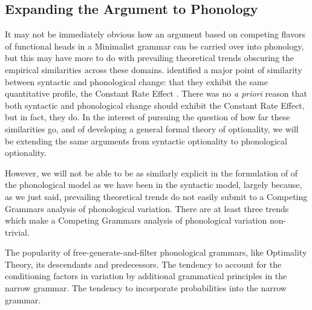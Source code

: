 
\subsection{Expanding the Argument to Phonology}

It may not be immediately obvious how an argument based on competing flavors of functional heads in a Minimalist grammar can be carried over into phonology, but this may have more to do with prevailing theoretical trends obscuring the empirical similarities across these domains.
\citet*{fruehwaldgresswallenberg2013} identified a major point of similarity between syntactic and phonological change: that they exhibit the same quantitative profile, the Constant Rate Effect \citep{kroch1989}.
There was no {\it a priori} reason that both syntactic and phonological change should exhibit the Constant Rate Effect, but in fact, they do.
In the interest of pursuing the question of how far these similarities go, and of developing a general formal theory of optionality, we will be extending the same arguments from syntactic optionality to phonological optionality.



However, we will not be able to be as similarly explicit in the formulation of of the phonological model as we have been in the syntactic model, largely because, as we just said, prevailing theoretical trends do not easily submit to a Competing Grammars analysis of phonological variation.
There are at least three trends which make a Competing Grammars analysis of phonological variation non-trivial.
\begin{exe}
	\ex \label{ot-tend}
		 The popularity of free-generate-and-filter phonological grammars, like Optimality Theory, its descendants and predecessors.
	\ex \label{gram-tend}
		The tendency to account for the conditioning factors in variation by additional grammatical principles in the narrow grammar.
	\ex \label{prob-tend}
		The tendency to incorporate probabilities into the narrow grammar.
\end{exe}

